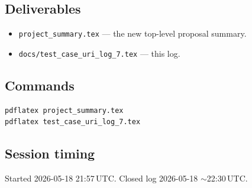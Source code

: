 \documentclass[11pt]{article}
\begin{document}
\subsection{Deliverables}

\begin{itemize}
  \item \texttt{project\_summary.tex} --- the new top-level
    proposal summary.
  \item \texttt{docs/test\_case\_uri\_log\_7.tex} --- this log.
\end{itemize}

\subsection{Commands}

\begin{lstlisting}
pdflatex project_summary.tex
pdflatex test_case_uri_log_7.tex
\end{lstlisting}

\subsection{Session timing}

Started 2026-05-18 21:57\,UTC. Closed log 2026-05-18
$\sim$22:30\,UTC.
\end{document}
